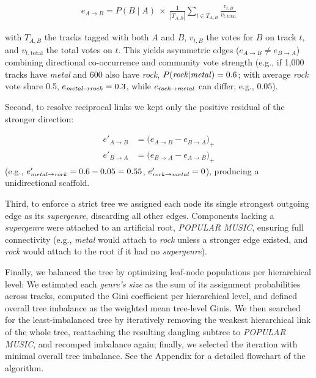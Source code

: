 \documentclass{article}
\begin{document}
\begin{align}\label{eq:initial_network}
e_{A\rightarrow B} = P(B \mid A)\ \times\ \frac{1}{|T_{A,B}|}\sum_{t\in T_{A,B}}
\frac{v_{t,B}}{v_{t,\text{total}}}
\end{align}

with $T_{A,B}$ the tracks tagged with both $A$ and $B$, $v_{t,B}$ the votes for $B$ on track $t$, and $v_{t,\text{total}}$ the total votes on $t$. This yields asymmetric edges ($e_{A\rightarrow B} \neq e_{B\rightarrow A}$) combining directional co-occurrence and community vote strength (e.g., if 1,000 tracks have \textit{metal} and 600 also have \textit{rock}, $P(\text{\textit{rock}}|\text{\textit{metal}})=0.6$; with average \textit{rock} vote share 0.5, $e_{\text{\textit{metal}}\rightarrow\text{\textit{rock}}}=0.3$, while $e_{\text{\textit{rock}}\rightarrow\text{\textit{metal}}}$ can differ, e.g., $0.05$).


Second, to resolve reciprocal links we kept only the positive residual of the stronger direction:

\begin{align}\label{eq:remove_weaker_edge}
e'_{A\to B} &= \big(e_{A\to B}-e_{B\to A}\big)_+ \\
e'_{B\to A} &= \big(e_{B\to A}-e_{A\to B}\big)_+
\end{align}
(e.g., $e'_{\text{\textit{metal}}\to\text{\textit{rock}}}=0.6-0.05=0.55$, $e'_{\text{\textit{rock}}\to\text{\textit{metal}}}=0$), producing a unidirectional scaffold.

Third, to enforce a strict tree we assigned each node its single strongest outgoing edge as its \textit{supergenre}, discarding all other edges. Components lacking a \textit{supergenre} were attached to an artificial root, \textit{POPULAR MUSIC}, ensuring full connectivity (e.g., \textit{metal} would attach to \textit{rock} unless a stronger edge existed, and \textit{rock} would attach to the root if it had no \textit{supergenre}).

\label{sec:gini_explanation}
Finally, we balanced the tree by optimizing leaf-node populations per hierarchical level: We estimated each \textit{genre's size} as the sum of its assignment probabilities across tracks, computed the Gini coefficient per hierarchical level, and defined overall tree imbalance as the weighted mean tree-level Ginis. We then searched for the least-imbalanced tree by iteratively removing the weakest hierarchical link of the whole tree, reattaching the resulting dangling subtree to \textit{POPULAR MUSIC}, and recomped imbalance again; finally, we selected the iteration with minimal overall tree imbalance. See the Appendix for a detailed flowchart of the algorithm.
\end{document}
